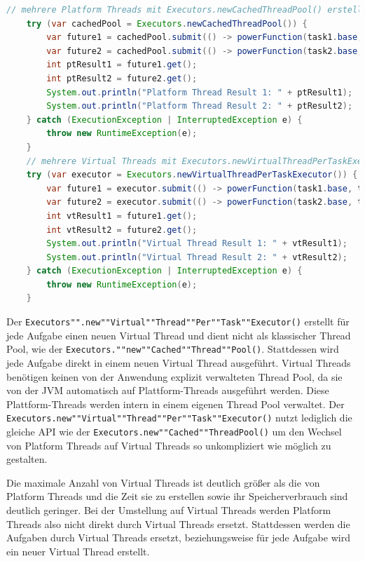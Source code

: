 \documentclass[fontsize=12pt,paper=a4,twoside=semi,parskip=half-,headsepline,headinclude]{scrreprt}
\newcommand{\code}[1]{\texttt{#1}}
\begin{document}
\begin{lstlisting}[language=Java]
	// mehrere Platform Threads mit Executors.newCachedThreadPool() erstellen
	try (var cachedPool = Executors.newCachedThreadPool()) {
		var future1 = cachedPool.submit(() -> powerFunction(task1.base, task1.exponent));
		var future2 = cachedPool.submit(() -> powerFunction(task2.base, task2.exponent));
		int ptResult1 = future1.get();
		int ptResult2 = future2.get();
		System.out.println("Platform Thread Result 1: " + ptResult1);
		System.out.println("Platform Thread Result 2: " + ptResult2);
	} catch (ExecutionException | InterruptedException e) {
		throw new RuntimeException(e);
	}
	// mehrere Virtual Threads mit Executors.newVirtualThreadPerTaskExecutor() erstellen
	try (var executor = Executors.newVirtualThreadPerTaskExecutor()) {
		var future1 = executor.submit(() -> powerFunction(task1.base, task1.exponent));
		var future2 = executor.submit(() -> powerFunction(task2.base, task2.exponent));
		int vtResult1 = future1.get();
		int vtResult2 = future2.get();
		System.out.println("Virtual Thread Result 1: " + vtResult1);
		System.out.println("Virtual Thread Result 2: " + vtResult2);
	} catch (ExecutionException | InterruptedException e) {
		throw new RuntimeException(e);
	}
\end{lstlisting}
Der \code{Executors"".new""Virtual""Thread""Per""Task""Executor()} erstellt für jede Aufgabe einen neuen Virtual Thread und dient nicht als klassischer Thread Pool, wie der \code{Executors.""new""Cached""Thread""Pool()}. Stattdessen wird jede Aufgabe direkt in einem neuen Virtual Thread ausgeführt. Virtual Threads benötigen keinen von der Anwendung explizit verwalteten Thread Pool, da sie von der JVM automatisch auf Plattform-Threads ausgeführt werden. Diese Plattform-Threads werden intern in einem eigenen Thread Pool verwaltet. Der \code{Executors.new""Virtual""Thread""Per""Task""Executor()} nutzt lediglich die gleiche API wie der \code{Executors.new""Cached""ThreadPool()} um den Wechsel von Platform Threads auf Virtual Threads so unkompliziert wie möglich zu gestalten.

Die maximale Anzahl von Virtual Threads ist deutlich größer als die von Platform Threads und die Zeit sie zu erstellen sowie ihr Speicherverbrauch sind deutlich geringer. Bei der Umstellung auf Virtual Threads werden Platform Threads also nicht direkt durch Virtual Threads ersetzt. Stattdessen werden die Aufgaben durch Virtual Threads ersetzt, beziehungsweise für jede Aufgabe wird ein neuer Virtual Thread erstellt. 
\end{document}
